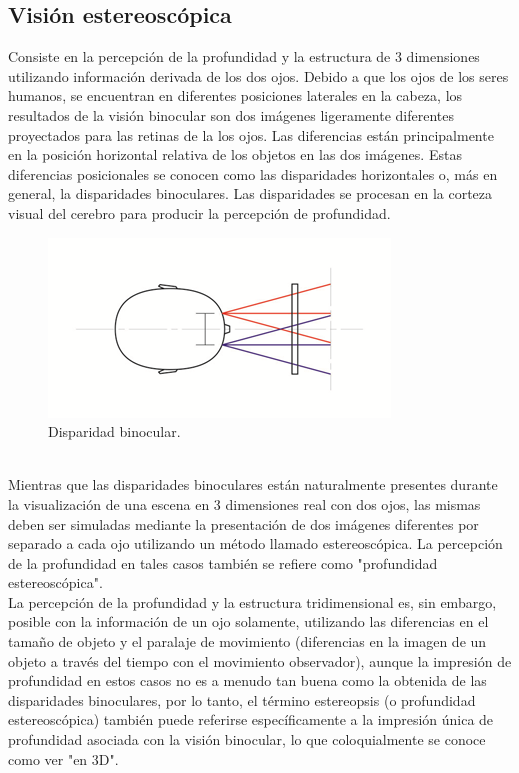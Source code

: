 \documentclass[12pt]{article}
\begin{document}
\subsection{Visión estereoscópica}
Consiste en la percepción de la profundidad y la estructura de 3 dimensiones utilizando información derivada de los dos ojos. Debido a que los ojos de los seres humanos, se encuentran en diferentes posiciones laterales en la cabeza, los resultados de la visión binocular son dos imágenes ligeramente diferentes proyectados para las retinas de la los ojos. Las diferencias están principalmente en la posición horizontal relativa de los objetos en las dos imágenes. Estas diferencias posicionales se conocen como las disparidades horizontales o, más en general, la disparidades binoculares. Las disparidades se procesan en la corteza visual del cerebro para producir la percepción de profundidad\cite{visionest}. 
\begin{figure}[h!]
\includegraphics[width =0.7\linewidth, center]{ojos.png}
\caption{Disparidad binocular.}
\label{ fig : surface }
\end{figure}
\\Mientras que las disparidades binoculares están naturalmente presentes durante la visualización de una escena en 3 dimensiones real con dos ojos, las mismas deben ser simuladas mediante la presentación de dos imágenes diferentes por separado a cada ojo utilizando un método llamado estereoscópica. La percepción de la profundidad en tales casos también se refiere como "profundidad estereoscópica". 
\\La percepción de la profundidad y la estructura tridimensional  es, sin embargo, posible con la información de un ojo solamente, utilizando las diferencias en el tamaño de objeto y el paralaje de movimiento (diferencias en la imagen de un objeto a través del tiempo con el movimiento observador), aunque la impresión de profundidad en estos casos no es a menudo tan buena como la obtenida de las disparidades binoculares, por lo tanto, el término estereopsis (o profundidad estereoscópica) también puede referirse específicamente a la impresión única de profundidad asociada con la visión binocular, lo que coloquialmente se conoce como ver "en 3D".
\end{document}
